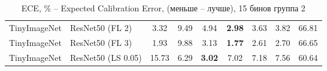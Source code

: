 \begin{table}[h!]
{\begin{tabular}{llccccccc}
TinyImageNet &             ResNet50 (FL 2) &                  3.32 &                  9.49 &                  4.94 & \textbf{2.98} &                  3.63 &                  3.82 &                 66.81 \\
TinyImageNet &             ResNet50 (FL 3) &                  1.93 &                  9.88 &                  3.13 & \textbf{1.77} &                  2.61 &                  2.70 &                 66.65 \\
TinyImageNet &          ResNet50 (LS 0.05) &                 15.73 &                  6.29 & \textbf{3.02} &                  7.02 &                  7.18 &                  7.56 &                 60.64 \\
\bottomrule
\end{tabular}%
}
\caption{ECE, \% -- Expected Calibration Error, (меньше -- лучше), 15 бинов группа 2}
\label{tab:metrics:ECE_2}
\end{table}
